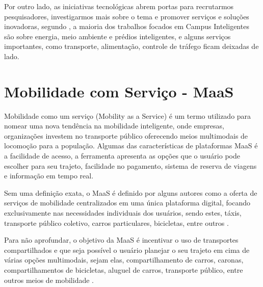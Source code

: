 Por outro lado, as iniciativas tecnológicas abrem portas para recrutarmos pesquisadores, investigarmos mais sobre o tema e promover serviços e soluções inovadoras, segundo \cite{alghamdi}, a maioria dos trabalhos focados em Campus Inteligentes são sobre energia, meio ambiente e prédios inteligentes, e alguns serviços importantes, como transporte, alimentação, controle de tráfego ficam deixadas de lado.

\section{Mobilidade com Serviço - MaaS}

Mobilidade como um serviço (Mobility as a Service) é um termo utilizado para nomear uma nova tendência na mobilidade inteligente, onde empresas, organizações investem no transporte público oferecendo meios multimodais de locomoção  para a população. Algumas das características de plataformas MaaS é a facilidade de acesso, a ferramenta apresenta as opções que o usuário pode escolher para seu trajeto, facilidade no pagamento, sistema de reserva de viagens e informação em tempo real.

Sem uma definição exata, o MaaS é definido por alguns autores como a oferta de serviços de mobilidade centralizados em uma única plataforma digital, focando exclusivamente nas necessidades individuais dos usuários, sendo estes, táxis, transporte público coletivo, carros particulares, bicicletas, entre outros \cite{jittrapirom, kamargianni, mulley}.

Para não aprofundar, o objetivo da MaaS é incentivar o uso de transportes compartilhados e que seja possível o usuário planejar o seu trajeto em cima de várias opções multimodais, sejam elas, compartilhamento de carros, caronas, compartilhamentos de bicicletas, aluguel de carros, transporte público, entre outros meios de mobilidade \cite{jittrapirom}. 

